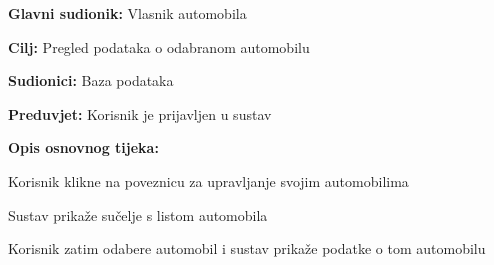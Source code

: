 \noindent {}
\begin{packed_item}
	
	\item \textbf{Glavni sudionik: } Vlasnik automobila
	\item  \textbf{Cilj:} Pregled podataka o odabranom automobilu
	\item  \textbf{Sudionici:} Baza podataka
	\item  \textbf{Preduvjet:} Korisnik je prijavljen u sustav
	\item  \textbf{Opis osnovnog tijeka:}
	
	\item[] \begin{packed_enum}
		
		\item Korisnik klikne na poveznicu za upravljanje svojim automobilima
		\item Sustav prikaže sučelje s listom automobila
		\item Korisnik zatim odabere automobil i sustav prikaže podatke o tom
		automobilu
		
	\end{packed_enum}
\end{packed_item}

